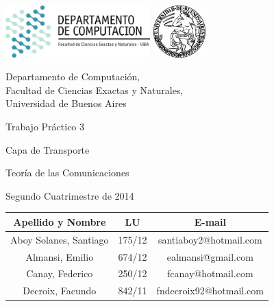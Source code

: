 \documentclass[a4paper, 10pt, twoside]{article}
\begin{document}


\thispagestyle{caratula}

\begin{center}

\includegraphics[height=2cm]{DC.png} 
\hfill
\includegraphics[height=2cm]{UBA.jpg} 

\vspace{2cm}

Departamento de Computación,\\
Facultad de Ciencias Exactas y Naturales,\\
Universidad de Buenos Aires

\vspace{4cm}

\begin{Huge}
Trabajo Práctico 3
\end{Huge}

\vspace{0.5cm}

\begin{Large}
Capa de Transporte
\end{Large}

\vspace{0.5cm}

\begin{Large}
Teoría de las Comunicaciones
\end{Large}

\vspace{1cm}

Segundo Cuatrimestre de 2014

\vspace{4cm}

\begin{tabular}{|c|c|c|}
\hline
Apellido y Nombre & LU & E-mail\\
\hline
Aboy Solanes, Santiago & 175/12  & santiaboy2@hotmail.com\\
Almansi, Emilio        & 674/12  & ealmansi@gmail.com\\
Canay, Federico        & 250/12  & fcanay@hotmail.com\\
Decroix, Facundo       & 842/11  & fndecroix92@hotmail.com\\
\hline
\end{tabular}

\end{center}
\end{document}
